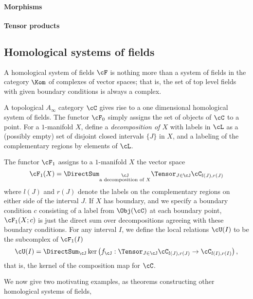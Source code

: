\paragraph{Morphisms}

\paragraph{Tensor products}

\subsection{Homological systems of fields}
A homological system of fields $\cF$ is nothing more than a system of fields in the category $\Kom$ of complexes of vector spaces; that is, the set of top level fields with given boundary conditions is always a complex.



A topological $A_\infty$ category $\cC$ gives rise to a one dimensional homological system of fields. The functor $\cF_0$ simply assigns the set of objects of $\cC$ to a point. 
For a $1$-manifold $X$, define a \emph{decomposition of $X$} with labels in $\cL$ as a (possibly empty) set of disjoint closed intervals $\{J\}$ in $X$, and a labeling of the complementary regions by elements of $\cL$.

The functor $\cF_1$ assigns to a $1$-manifold $X$ the vector space
\begin{equation*}
\cF_1(X) = \DirectSum_{\substack{\cJ \\ \text{a decomposition of $X$}}} \Tensor_{J \in \cJ} \cC_{l(J),r(J)}
\end{equation*}
where $l(J)$ and $r(J)$ denote the labels on the complementary regions on either side of the interval $J$. If $X$ has boundary, and we specify a boundary condition $c$ consisting of a label from $\Obj(\cC)$ at each boundary point, $\cF_1(X;c)$ is just the direct sum over decompositions agreeing with these boundary conditions. For any interval $I$, we define the local relations $\cU(I)$ to be the subcomplex of $\cF_1(I)$
\begin{equation*}
\cU(I) = \DirectSum_{\cJ} \ker\left(f_\cJ : \Tensor_{J \in \cJ} \cC_{l(J),r(J)} \to \cC_{l(I),r(I)} \right),
\end{equation*}
that is, the kernel of the composition map for $\cC$.


We now give two motivating examples, as theorems constructing other homological systems of fields,


